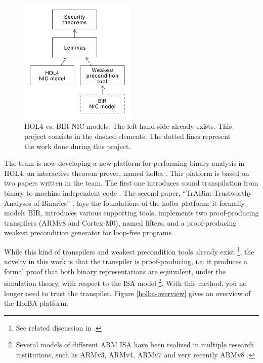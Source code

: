\documentclass{kththesis}
\begin{document}
\begin{figure}[ht]
	\includegraphics[height=6cm]{figures/hol-v-bir-nic-model-simple.png}
	\centering
	\caption{HOL4 vs. BIR NIC models. The left hand side already exists. This project consists in the dashed elements. The dotted lines represent the work done during this project.}
	\label{hol-v-bir-nic-model-simple}
\end{figure}

The team is now developing a new platform for performing binary analysis in HOL4, an interactive theorem prover, named \gls{holba} \cite{noauthor_holba_2019}. This platform is based on two papers written in the team. The first one introduces sound \gls{transpilation} from binary to machine-independent code \footnotemark \cite{metere_sound_2017}. The second paper, ``TrABin: Trustworthy Analyses of Binaries'' \cite{lindner_trabin:_2019}, lays the foundations of the \gls{holba} platform: it formally models \gls{BIR}, introduces various supporting tools, implements two \gls{proof-producing} \glspl{transpiler} (ARMv8 and Cortex-M0), named lifters, and a proof-producing weakest precondition generator for loop-free programs.


While this kind of \glspl{transpiler} and weakest precondition tools already exist \footnote{See related discussion in \cite{lindner_trabin:_2019}.}, the novelty in this work is that the transpiler is proof-producing, i.e. it produces a formal proof that both binary representations are equivalent, under the simulation theory, with respect to the \gls{ISA} model \footnote{Several models of different ARM \gls{ISA} have been realized in multiple research institutions, such as ARMv3, ARMv4, ARMv7 \cite{noauthor_canonical_2019, hutchison_trustworthy_2010} and very recently ARMv8 \cite{armstrong_isa_2019}.}. With this method, you no longer need to trust the transpiler. Figure \ref{holba-overview} gives an overview of the HolBA platform.
\end{document}
